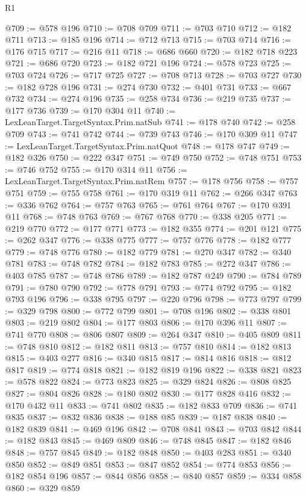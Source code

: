 \begin{lexlean}{R1}
\begin{coremodule}
@709 := @578 @196
@710 := @708 @709
@711 := @703 @710
@712 := @182 @711
@713 := @185 @196
@714 := @712 @713
@715 := @703 @714
@716 := @176 @715
@717 := @216 @11
@718 := @686 @660
@720 := @182 @718 @223
@721 := @686 @720
@723 := @182 @721 @196
@724 := @578 @723
@725 := @703 @724
@726 := @717 @725
@727 := @708 @713
@728 := @703 @727
@730 := @182 @728 @196
@731 := @274 @730
@732 := @401 @731
@733 := @667 @732
@734 := @274 @196
@735 := @258 @734
@736 := @219 @735
@737 := @177 @736
@739 := @170 @304 @11
@740 := LexLeanTarget.TargetSyntax.Prim.natSub
@741 := @178 @740
@742 := @258 @709
@743 := @741 @742
@744 := @739 @743
@746 := @170 @309 @11
@747 := LexLeanTarget.TargetSyntax.Prim.natQuot
@748 := @178 @747
@749 := @182 @326
@750 := @222 @347
@751 := @749 @750
@752 := @748 @751
@753 := @746 @752
@755 := @170 @314 @11
@756 := LexLeanTarget.TargetSyntax.Prim.natRem
@757 := @178 @756
@758 := @757 @751
@759 := @755 @758
@761 := @170 @319 @11
@762 := @266 @347
@763 := @336 @762
@764 := @757 @763
@765 := @761 @764
@767 := @170 @391 @11
@768 := @748 @763
@769 := @767 @768
@770 := @338 @205
@771 := @219 @770
@772 := @177 @771
@773 := @182 @355
@774 := @201 @121
@775 := @262 @347
@776 := @338 @775
@777 := @757 @776
@778 := @182 @777
@779 := @748 @776
@780 := @182 @779
@781 := @270 @347
@782 := @340 @781
@783 := @748 @782
@784 := @182 @783
@785 := @272 @347
@786 := @403 @785
@787 := @748 @786
@789 := @182 @787 @249
@790 := @784 @789
@791 := @780 @790
@792 := @778 @791
@793 := @774 @792
@795 := @182 @793 @196
@796 := @338 @795
@797 := @220 @796
@798 := @773 @797
@799 := @329 @798
@800 := @772 @799
@801 := @708 @196
@802 := @338 @801
@803 := @219 @802
@804 := @177 @803
@806 := @170 @396 @11
@807 := @741 @770
@808 := @806 @807
@809 := @264 @347
@810 := @405 @809
@811 := @748 @810
@812 := @182 @811
@813 := @757 @810
@814 := @182 @813
@815 := @403 @277
@816 := @340 @815
@817 := @814 @816
@818 := @812 @817
@819 := @774 @818
@821 := @182 @819 @196
@822 := @338 @821
@823 := @578 @822
@824 := @773 @823
@825 := @329 @824
@826 := @808 @825
@827 := @804 @826
@828 := @180 @802
@830 := @177 @828 @416
@832 := @170 @432 @11
@833 := @741 @802
@835 := @182 @833 @709
@836 := @741 @835
@837 := @832 @836
@838 := @188 @85
@839 := @187 @838
@840 := @182 @839
@841 := @469 @196
@842 := @708 @841
@843 := @703 @842
@844 := @182 @843
@845 := @469 @809
@846 := @748 @845
@847 := @182 @846
@848 := @757 @845
@849 := @182 @848
@850 := @403 @283
@851 := @340 @850
@852 := @849 @851
@853 := @847 @852
@854 := @774 @853
@856 := @182 @854 @196
@857 := @844 @856
@858 := @840 @857
@859 := @334 @858
@860 := @329 @859

\end{coremodule}
\end{lexlean}
